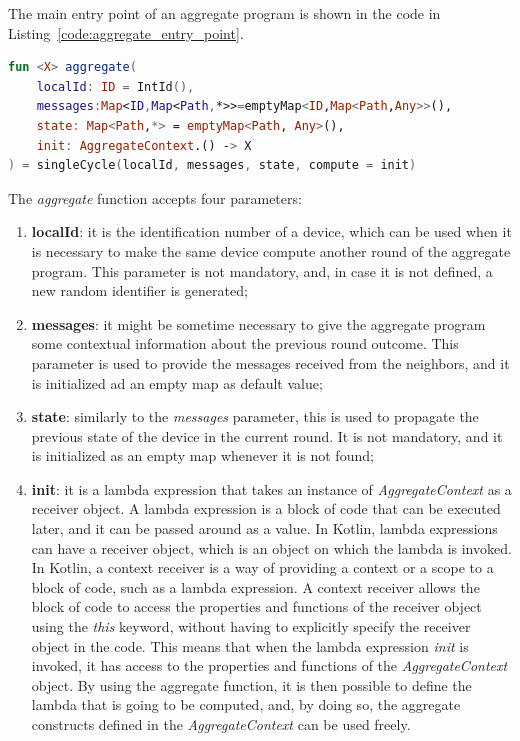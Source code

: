 The main entry point of an aggregate program is shown in the code in Listing~\ref{code:aggregate_entry_point}.
\begin{lstlisting}[caption={Aggregate entry point}, captionpos=b, language=Kotlin, label={code:aggregate_entry_point}]
fun <X> aggregate(
    localId: ID = IntId(),
    messages:Map<ID,Map<Path,*>>=emptyMap<ID,Map<Path,Any>>(),
    state: Map<Path,*> = emptyMap<Path, Any>(),
    init: AggregateContext.() -> X
) = singleCycle(localId, messages, state, compute = init)
\end{lstlisting}
The \textit{aggregate} function accepts four parameters:
\begin{enumerate}
    \item \textbf{localId}: it is the identification number of a device, which can be used when it is necessary to make the same device compute another round of the aggregate program. This parameter is not mandatory, and, in case it is not defined, a new random identifier is generated;
    \item \textbf{messages}: it might be sometime necessary to give the aggregate program some contextual information about the previous round outcome. This parameter is used to provide the messages received from the neighbors, and it is initialized ad an empty map as default value;
    \item \textbf{state}: similarly to the \textit{messages} parameter, this is used to propagate the previous state of the device in the current round. It is not mandatory, and it is initialized as an empty map whenever it is not found;
    \item \textbf{init}: it is a lambda expression that takes an instance of \textit{AggregateContext} as a receiver object.\newline
    A lambda expression is a block of code that can be executed later, and it can be passed around as a value. In Kotlin, lambda expressions can have a receiver object, which is an object on which the lambda is invoked.\newline
    In Kotlin, a context receiver is a way of providing a context or a scope to a block of code, such as a lambda expression. A context receiver allows the block of code to access the properties and functions of the receiver object using the \textit{this} keyword, without having to explicitly specify the receiver object in the code.\newline
    This means that when the lambda expression \textit{init} is invoked, it has access to the properties and functions of the \textit{AggregateContext} object. By using the aggregate function, it is then possible to define the lambda that is going to be computed, and, by doing so, the aggregate constructs defined in the \textit{AggregateContext} can be used freely.
\end{enumerate}

